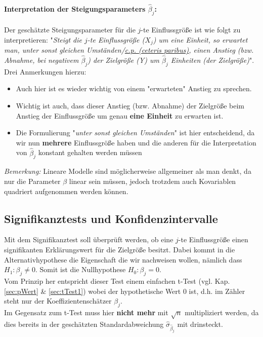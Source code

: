 \documentclass[a4paper]{article}
\newcommand\dangersign[1][2ex]{%
  \renewcommand\stacktype{L}%
  \scaleto{\stackon[1.3pt]{\color{red}$\triangle$}{\tiny !}}{#1}%
}
\begin{document}
\paragraph{Interpretation der Steigungsparameters $\hat \beta_j$:} Der geschätzte Steigungsparameter für die $j$-te Einflussgröße ist wie folgt zu interpretieren: "\textit{Steigt die $j$-te Einflussgröße ($X_j$) um eine Einheit, so erwartet man, unter sonst gleichen Umständen/\href{https://de.wikipedia.org/wiki/Ceteris_paribus}{c.p. (ceteris paribus)}, einen Anstieg (bzw. Abnahme, bei negativem $\hat \beta_j$) der Zielgröße (Y) um $\hat \beta_j$ Einheiten (der Zielgröße)}".\\
Drei Anmerkungen hierzu:
\begin{itemize}
    \item Auch hier ist es wieder wichtig von einem "erwarteten" Anstieg zu sprechen.
    \item Wichtig ist auch, dass dieser Anstieg (bzw. Abnahme) der Zielgröße beim Anstieg der Einflussgröße um genau \textbf{eine Einheit} zu erwarten ist.
    \item Die Formulierung "\textit{unter sonst gleichen Umständen}" ist hier entscheidend, da wir nun \textbf{mehrere} Einflussgröße haben und die anderen für die Interpretation von $\hat \beta_j$ konstant gehalten werden müssen
\end{itemize}

\noindent \dangersign[3ex] \textit{Bemerkung:} Lineare Modelle sind möglicherweise allgemeiner als man denkt, da nur die Parameter $\beta$ linear sein müssen, jedoch trotzdem auch Kovariablen quadriert aufgenommen werden können.

\subsection{Signifikanztests und Konfidenzintervalle}
Mit dem Signifikanztest soll überprüft werden, ob eine $j$-te Einflussgröße einen signifikanten Erklärungswert für die Zielgröße besitzt. Dabei kommt in die Alternativhypothese die Eigenschaft die wir nachweisen wollen, nämlich dass $H_1: \beta_j \neq 0$. Somit ist die Nullhypothese $H_0:\beta_j=0$.\\
Vom Prinzip her entspricht dieser Test einem einfachen t-Test (vgl. Kap. \ref{sec:pWert} \& \ref{sec:tTest1}) wobei der hypothetische Wert 0 ist, d.h. im Zähler steht nur der Koeffizientenschätzer $\beta_j$.\\

\noindent \dangersign[3ex] Im Gegensatz zum t-Test muss hier \textbf{nicht mehr} mit $\sqrt{n}$ multipliziert werden, da dies bereits in der geschätzten Standardabweichung $\hat \sigma_{\hat \beta_j}$ mit drinsteckt.\\
\end{document}
